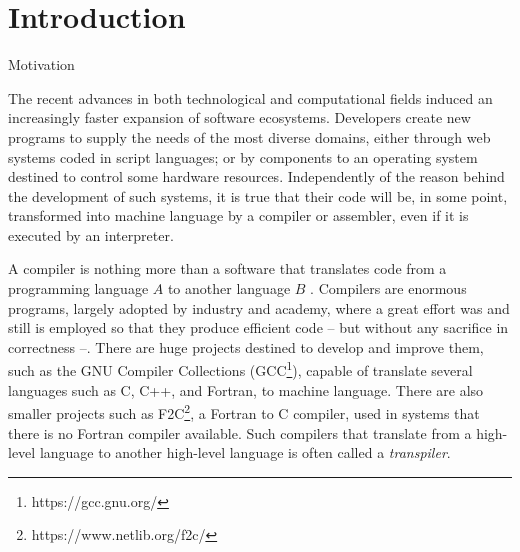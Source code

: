 \chapter{Introduction}
\label{cap:introducao}

\begin{section}{Motivation}

The recent advances in both technological and computational fields induced an
increasingly faster expansion of software ecosystems. Developers create new
programs to supply the needs of the most diverse domains, either through web
systems coded in script languages; or by components to an operating system
destined to control some hardware resources. Independently of the reason behind
the development of such systems, it is true that their code will be, in some
point, transformed into machine language by a compiler or assembler, even if it
is executed by an interpreter.



A compiler is nothing more than a software that translates code from a
programming language $A$ to another language $B$ \citep{dragonbook}.  Compilers
are enormous programs, largely adopted by industry and academy, where a great
effort was and still is employed so that they produce efficient code -- but
without any sacrifice in correctness --. There are huge projects destined to
develop and improve them, such as the GNU Compiler Collections
(GCC\footnote{https://gcc.gnu.org/}), capable of translate several languages
such as C, C++, and Fortran, to machine language. There are also smaller
projects such as F2C\footnote{https://www.netlib.org/f2c/}, a Fortran to C
compiler, used in systems that there is no Fortran compiler available. Such
compilers that translate from a high-level language to another high-level
language is often called a \textit{transpiler}.


\end{section}
